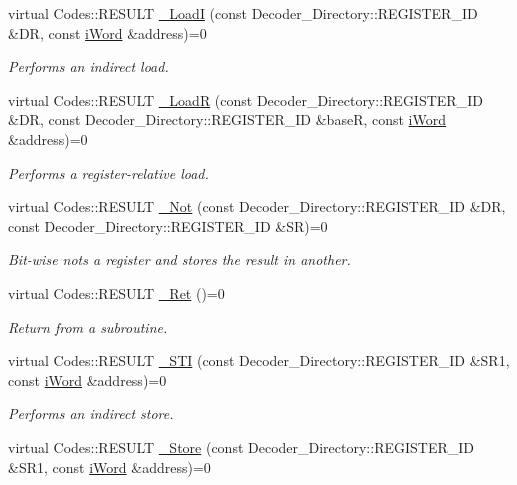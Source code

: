 \begin{DoxyCompactItemize}
virtual Codes::RESULT \hyperlink{classiWi11_a2a331ba57f78c203ba55fefde42cbc2b}{\_\-LoadI} (const Decoder\_\-Directory::REGISTER\_\-ID \&DR, const \hyperlink{classiWord}{iWord} \&address)=0
\begin{DoxyCompactList}\small\item\em Performs an indirect load. \item\end{DoxyCompactList}\item 
virtual Codes::RESULT \hyperlink{classiWi11_a29bb8d1f20ead4f5908c5505a06e5c57}{\_\-LoadR} (const Decoder\_\-Directory::REGISTER\_\-ID \&DR, const Decoder\_\-Directory::REGISTER\_\-ID \&baseR, const \hyperlink{classiWord}{iWord} \&address)=0
\begin{DoxyCompactList}\small\item\em Performs a register-\/relative load. \item\end{DoxyCompactList}\item 
virtual Codes::RESULT \hyperlink{classiWi11_a8925fab615cdc317ab256d514c23bc5e}{\_\-Not} (const Decoder\_\-Directory::REGISTER\_\-ID \&DR, const Decoder\_\-Directory::REGISTER\_\-ID \&SR)=0
\begin{DoxyCompactList}\small\item\em Bit-\/wise nots a register and stores the result in another. \item\end{DoxyCompactList}\item 
virtual Codes::RESULT \hyperlink{classiWi11_ae6c1048642dbf2c03c60062f6aaabfd2}{\_\-Ret} ()=0
\begin{DoxyCompactList}\small\item\em Return from a subroutine. \item\end{DoxyCompactList}\item 
virtual Codes::RESULT \hyperlink{classiWi11_a1bd8c4396aa8f3d01b18e14083c25056}{\_\-STI} (const Decoder\_\-Directory::REGISTER\_\-ID \&SR1, const \hyperlink{classiWord}{iWord} \&address)=0
\begin{DoxyCompactList}\small\item\em Performs an indirect store. \item\end{DoxyCompactList}\item 
virtual Codes::RESULT \hyperlink{classiWi11_aed4eb93ca7dd50a00dbed816a3ab2e28}{\_\-Store} (const Decoder\_\-Directory::REGISTER\_\-ID \&SR1, const \hyperlink{classiWord}{iWord} \&address)=0

\end{DoxyCompactItemize}
